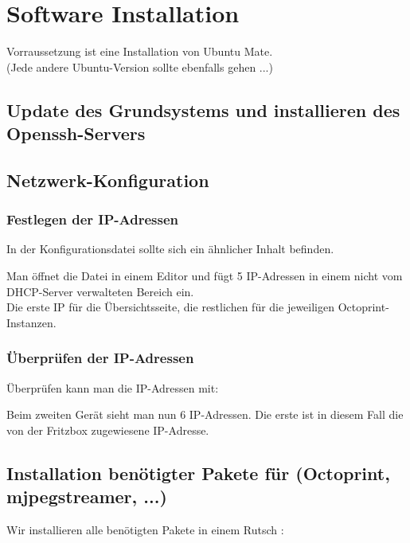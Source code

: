 \newpage

\section{Software Installation}

Vorraussetzung ist eine Installation von Ubuntu Mate. \\
(Jede andere Ubuntu-Version sollte ebenfalls gehen ...)

\subsection{Update des Grundsystems und installieren des Openssh-Servers}
%
\subsection{Netzwerk-Konfiguration}
\subsubsection{Festlegen der IP-Adressen}
In der Konfigurationsdatei sollte sich ein ähnlicher Inhalt befinden.

Man öffnet die Datei in einem Editor und fügt 5 IP-Adressen in einem nicht vom DHCP-Server verwalteten Bereich ein. \\

Die erste IP für die Übersichtsseite, die restlichen für die jeweiligen Octoprint-Instanzen.

\newpage
\subsubsection{Überprüfen der IP-Adressen}

Überprüfen kann man die IP-Adressen mit:

Beim zweiten Gerät sieht man nun 6 IP-Adressen. Die erste ist in diesem Fall die von der Fritzbox zugewiesene IP-Adresse.

\newpage
\subsection{Installation benötigter Pakete für (Octoprint, mjpegstreamer, ...)}
Wir installieren alle benötigten Pakete in einem Rutsch :


